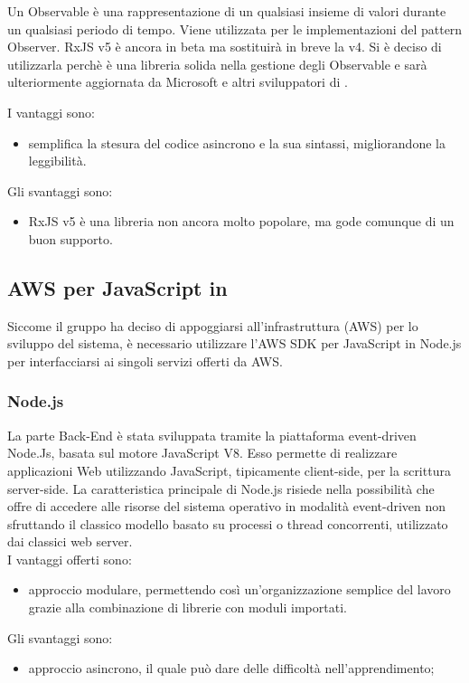 Un Observable è una rappresentazione di un qualsiasi insieme di valori durante un qualsiasi periodo di tempo. Viene utilizzata per le implementazioni del pattern Observer.
RxJS v5 è ancora in beta ma sostituirà in breve la v4. Si è deciso di utilizzarla perchè è una libreria solida nella gestione degli Observable e sarà ulteriormente aggiornata
da Microsoft e altri sviluppatori di  .

I vantaggi sono:
\begin{itemize}
	\item semplifica la stesura del codice asincrono e la sua sintassi, migliorandone la leggibilità.
\end{itemize}
Gli svantaggi sono:
\begin{itemize}
	\item RxJS v5 è una libreria non ancora molto popolare, ma gode comunque di un buon supporto.
\end{itemize}

\subsection{AWS  per JavaScript in }

Siccome il gruppo ha deciso di appoggiarsi all'infrastruttura  (AWS) per lo sviluppo del sistema, è necessario utilizzare l'AWS SDK per JavaScript in Node.js per
interfacciarsi ai singoli servizi offerti da AWS.

\subsubsection{Node.js}
La parte Back-End è stata sviluppata tramite la piattaforma event-driven Node.Js, basata sul motore JavaScript V8. Esso permette di realizzare applicazioni Web utilizzando JavaScript, tipicamente client-side, per la scrittura server-side. La caratteristica principale di Node.js risiede nella possibilità che offre di accedere alle risorse del sistema operativo in modalità event-driven non sfruttando il classico modello basato su processi o thread concorrenti, utilizzato dai classici web server.\\
I vantaggi offerti sono:
\begin{itemize}
	\item approccio modulare, permettendo così un’organizzazione semplice del lavoro grazie alla combinazione di librerie con moduli importati.
\end{itemize}
Gli svantaggi sono:
\begin{itemize}
	\item approccio asincrono, il quale può dare delle difficoltà nell'apprendimento;
\end{itemize}

